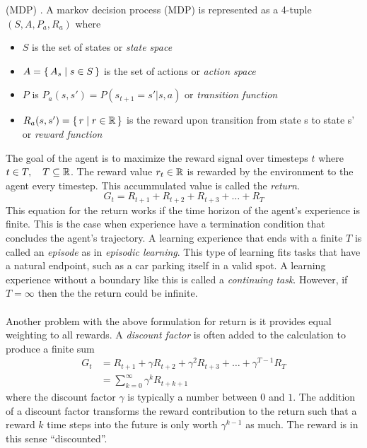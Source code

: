 (MDP) \cite{Bel:57}.
A markov decision process (MDP) is represented as a 4-tuple $(S, A, P_a, R_a)$ where 
\begin{itemize}
    \item $S$ is the set of states or \textit{state space}
    \item $A=\set{A_s | s \in S}$ is the set of actions or \textit{action space}
    \item $P$ is $P_a(s, s') = P(s_{t+1} = s' | s, a)$ or \textit{transition function}
    \item $R_a(s, s')=\set{r | r \in \mathbb R}$ is the reward upon transition from state s to state s' or \textit{reward function}
\end{itemize}
The goal of the agent is to maximize the reward signal over timesteps $t$ where
$t \in T, \quad T \subseteq \mathbb R$. The reward value $r_t \in \mathbb R$ is rewarded by the 
environment to the agent every timestep.
This accummulated value is called the \textit{return}. 
\begin{equation}
    G_t = R_{t+1} + R_{t+2} + R_{t+3} + \ldots + R_{T} 
\end{equation}
This equation for the return works if the time horizon of the agent's experience is finite.
This is the case when experience have a termination condition that concludes the agent's 
trajectory. A learning experience that ends with a finite $T$ is called an \textit{episode}
as in \textit{episodic learning}. This type of learning fits tasks that have a natural
endpoint, such as a car parking itself in a valid spot.
A learning experience without a boundary like this is called a \textit{continuing task}.
However, if $T = \infty$ then the the return could be infinite. \\\\
Another problem with the above formulation for return is it provides equal weighting to
all rewards. 
A \textit{discount factor} is often added to the calculation to produce a finite sum
\begin{align}
    G_t &= R_{t+1} + \gamma R_{t+2} + \gamma^{2} R_{t+3} + \ldots + \gamma^{T-1}R_{T} \\
    &= \sum_{k=0}^\infty \gamma^{k} R_{t+k+1}
\end{align}
where the discount factor $\gamma$ is typically a number between $0$ and $1$. The 
addition of a discount factor transforms the reward contribution to the return such that
a reward $k$ time steps into the future is only worth $\gamma^{k-1}$ as much. The reward
is in this sense ``discounted''. 
\\\\
